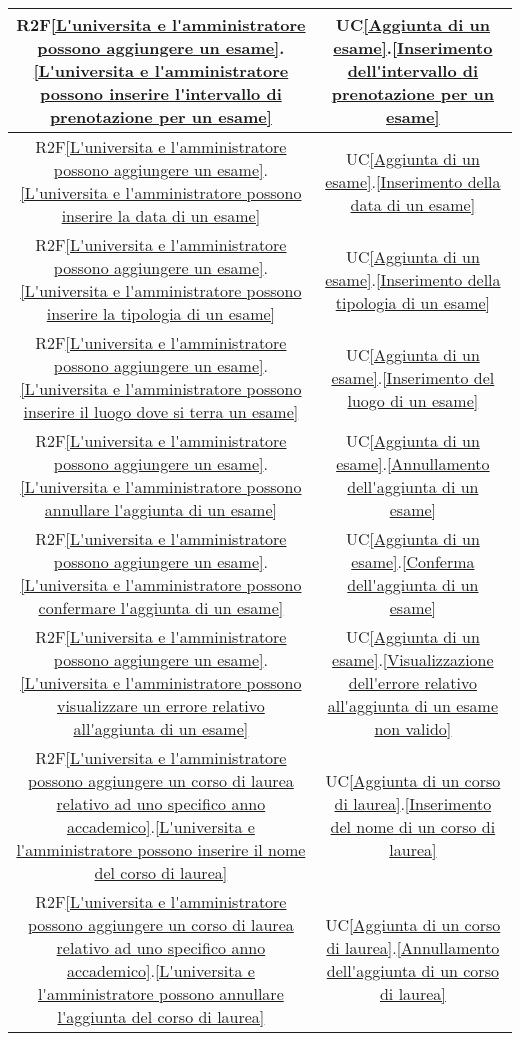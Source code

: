 \begin{longtable}{|c|c|}
R2F\ref{L'universita e l'amministratore possono aggiungere un esame}.\ref{L'universita e l'amministratore possono inserire l'intervallo di prenotazione per un esame} & UC\ref{Aggiunta di un esame}.\ref{Inserimento dell'intervallo di prenotazione per un esame}\\
\hline
R2F\ref{L'universita e l'amministratore possono aggiungere un esame}.\ref{L'universita e l'amministratore possono inserire la data di un esame} & UC\ref{Aggiunta di un esame}.\ref{Inserimento della data di un esame}\\
\hline
R2F\ref{L'universita e l'amministratore possono aggiungere un esame}.\ref{L'universita e l'amministratore possono inserire la tipologia di un esame} & UC\ref{Aggiunta di un esame}.\ref{Inserimento della tipologia di un esame}\\
\hline
R2F\ref{L'universita e l'amministratore possono aggiungere un esame}.\ref{L'universita e l'amministratore possono inserire il luogo dove si terra un esame} & UC\ref{Aggiunta di un esame}.\ref{Inserimento del luogo di un esame}\\
\hline
R2F\ref{L'universita e l'amministratore possono aggiungere un esame}.\ref{L'universita e l'amministratore possono annullare l'aggiunta di un esame} & UC\ref{Aggiunta di un esame}.\ref{Annullamento dell'aggiunta di un esame}\\
\hline
R2F\ref{L'universita e l'amministratore possono aggiungere un esame}.\ref{L'universita e l'amministratore possono confermare l'aggiunta di un esame} & UC\ref{Aggiunta di un esame}.\ref{Conferma dell'aggiunta di un esame}\\
\hline
R2F\ref{L'universita e l'amministratore possono aggiungere un esame}.\ref{L'universita e l'amministratore possono visualizzare un errore relativo all'aggiunta di un esame} & UC\ref{Aggiunta di un esame}.\ref{Visualizzazione dell'errore relativo all'aggiunta di un esame non valido}\\
\hline
R2F\ref{L'universita e l'amministratore possono aggiungere un corso di laurea relativo ad uno specifico anno accademico}.\ref{L'universita e l'amministratore possono inserire il nome del corso di laurea} & UC\ref{Aggiunta di un corso di laurea}.\ref{Inserimento del nome di un corso di laurea}\\
\hline
R2F\ref{L'universita e l'amministratore possono aggiungere un corso di laurea relativo ad uno specifico anno accademico}.\ref{L'universita e l'amministratore possono annullare l'aggiunta del corso di laurea} & UC\ref{Aggiunta di un corso di laurea}.\ref{Annullamento dell'aggiunta di un corso di laurea}\\

\end{longtable}
